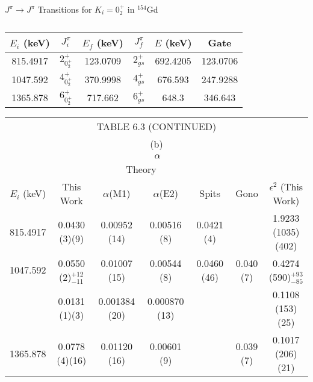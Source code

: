 \begin{landscape}
\begin{table}
    \centering
    \caption{$J^{\pi}\rightarrow J^{\pi}$ Transitions for $K_i=0^+_2$ in $^{154}$Gd}
    \label{tab:154Gd_02_Gate_Disc}
\begin{ThreePartTable}
    \begin{subtable}{\textwidth}
        \caption{}
    \begin{tabular}{c|c|c|c|c|c}
        \toprule
        $E_i$ (keV)	& $J^{\pi}_i$ &	$E_f$ (keV)	& $J^{\pi}_f$ & $E$ (keV)	&	Gate \\
        \hline
        815.4917 & $2^+_{0^+_2}$ & 123.0709 & $2^+_{gs}$ & 692.4205 & 123.0706\\ \hline
        1047.592 & $4^+_{0^+_2}$ & 370.9998 & $4^+_{gs}$ &  676.593 & 247.9288 \\\hline
        1365.878 & $6^+_{0^+_2}$ & 717.662 & $6^+_{gs}$ & 648.3 & 346.643 \\
	    \bottomrule
    \end{tabular}
    \end{subtable}
    \end{ThreePartTable}
\end{table}
\begin{table}
    \centering
    \ContinuedFloat
    \begin{subtable}{\textwidth}
    \end{subtable}
    \begin{ThreePartTable}
    \begin{subtable}{\textwidth}
        \begin{tabular}{c|c|c|c|c|c|c}
            \multicolumn{7}{c}{TABLE 6.3 (CONTINUED)} \\
            \multicolumn{7}{c}{(b)} \\
            \toprule
            & \multicolumn{5}{c|}{$\alpha$}	& 	\\ 
             &	& \multicolumn{2}{c|}{Theory\citep{kibedi08:_BRICC}}	& & 	\\ 
            $E_i$ (keV)	&This Work	& $\alpha$(M1) & $\alpha$(E2) &	Spits\citep{spits96:_154gd} & Gono\citep{gono74:_154gd_e0} & $\epsilon^2$ (This Work)	\\
            \hline
            815.4917 &  0.0430 (3)(9) & 0.00952 (14) & 0.00516 (8) &  0.0421 (4) & & 1.9233 (1035)(402)\\ \hline
            1047.592 & 0.0550 (2)$^{+12}_{-11}$ & 0.01007 (15) & 0.00544 (8) & 0.0460 (46) & 0.040 (7) & 0.4274 (590)$^{+93}_{-85}$\\
            &   0.0131 (1)(3) & 0.001384 (20) & 0.000870 (13) & & & 0.1108 (153)(25)\\ \hline
            1365.878  & 0.0778 (4)(16) & 0.01120 (16) & 0.00601 (9) & & 0.039 (7) & 0.1017 (206)(21)\\
            \bottomrule
        \end{tabular}
        \end{subtable}


\end{ThreePartTable}
\end{table}
\end{landscape}
